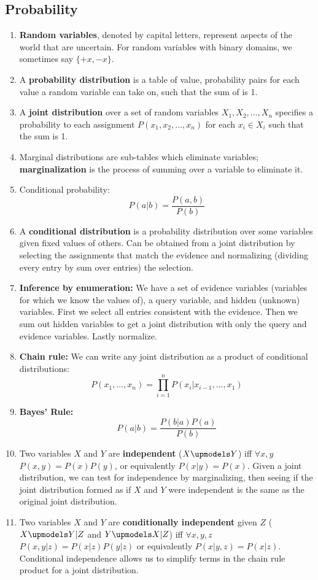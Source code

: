 \documentclass[10pt]{article}
\begin{document}
\begin{multicols}{2}
\begin{addmargin}[0.8em]{0.5em}
    \subsection{Probability}
        \begin{enumerate}[label=(\alph*)]
            \item \textbf{Random variables}, denoted by capital letters, represent aspects of the world that are uncertain. For random variables with binary domains, we sometimes say $\{+x, -x\}$.
            \item A \textbf{probability distribution} is a table of value, probability pairs for each value a random variable can take on, such that the sum of is 1.
            \item A \textbf{joint distribution} over a set of random variables $X_1, X_2, \hdots, X_n$ specifies a probability to each assignment $P(x_1, x_2, \hdots, x_n)$ for each $x_i \in X_i$ such that the sum is 1.
            \item Marginal distributions are sub-tables which eliminate variables; \textbf{marginalization} is the process of summing over a variable to eliminate it. 
            \item Conditional probability:
            $$P(a|b) = \frac{P(a,b)}{P(b)}$$
            \item A \textbf{conditional distribution} is a probability distribution over some variables given fixed values of others. Can be obtained from a joint distribution by selecting the assignments that match the evidence and normalizing (dividing every entry by sum over entries) the selection.
            \item \textbf{Inference by enumeration:} We have a set of evidence variables (variables for which we know the values of), a query variable, and hidden (unknown) variables. First we select all entries consistent with the evidence. Then we sum out hidden variables to get a joint distribution with only the query and evidence variables. Lastly normalize.
            \item \textbf{Chain rule:} We can write any joint distribution as a product of conditional distributions:
            $$P(x_1, \ldots, x_n) = \prod_{i=1}^{n} P(x_i | x_{i-1}, \ldots, x_1)$$
            \item \textbf{Bayes' Rule:} $$P(a|b) = \frac{P(b|a)P(a)}{P(b)}$$
            \item Two variables $X$ and $Y$ are \textbf{independent} ($X \upmodels Y$) iff  $\forall x, y$ $P(x,y)=P(x)P(y)$, or equivalently $P(x|y)=P(x)$. Given a joint distribution, we can test for independence by marginalizing, then seeing if the joint distribution formed as if $X$ and $Y$ were independent is the same as the original joint distribution.
            \item Two variables $X$ and $Y$ are \textbf{conditionally independent} given $Z$ ($X \upmodels Y | Z$ and $Y \upmodels X | Z$) iff $\forall x,y,z$ $P(x,y|z)=P(x|z)P(y|z)$ or equivalently $P(x|y,z)=P(x|z)$. Conditional independence allows us to simplify terms in the chain rule product for a joint distribution. 
             

\end{enumerate}
\end{addmargin}
\end{multicols}
\end{document}
